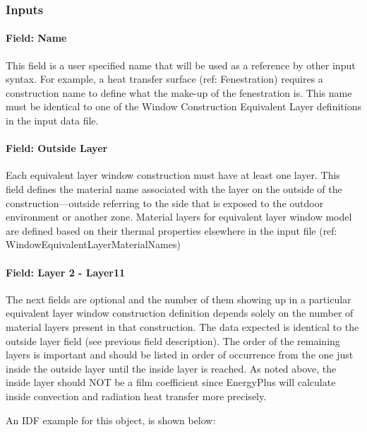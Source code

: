 \subsubsection{Inputs}\label{inputs-41}

\paragraph{Field: Name}\label{field-name-35}

This field is a user specified name that will be used as a reference by other input syntax. For example, a heat transfer surface (ref: Fenestration) requires a construction name to define what the make-up of the fenestration is. This name must be identical to one of the Window Construction Equivalent Layer definitions in the input data file.

\paragraph{Field: Outside Layer}\label{field-outside-layer-2}

Each equivalent layer window construction must have at least one layer. This field defines the material name associated with the layer on the outside of the construction---outside referring to the side that is exposed to the outdoor environment or another zone. Material layers for equivalent layer window model are defined based on their thermal properties elsewhere in the input file (ref: WindowEquivalentLayerMaterialNames)

\paragraph{Field: Layer 2 - Layer11}\label{field-layer-2---layer11}

The next fields are optional and the number of them showing up in a particular equivalent layer window construction definition depends solely on the number of material layers present in that construction. The data expected is identical to the outside layer field (see previous field description). The order of the remaining layers is important and should be listed in order of occurrence from the one just inside the outside layer until the inside layer is reached. As noted above, the inside layer should NOT be a film coefficient since EnergyPlus will calculate inside convection and radiation heat transfer more precisely.

An IDF example for this object, is shown below:

